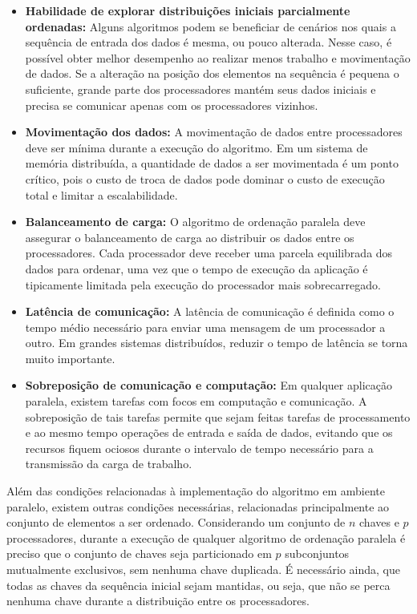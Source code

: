 \begin{itemize}
\item \textbf{Habilidade de explorar distribuições iniciais parcialmente ordenadas:}
Alguns algoritmos podem se beneficiar de cenários nos quais a sequência de entrada dos dados é mesma, ou pouco alterada. Nesse caso, é possível obter melhor desempenho ao realizar menos trabalho e movimentação de dados.
Se a alteração na posição dos elementos na sequência é pequena o suficiente, grande parte dos processadores mantém seus dados iniciais e precisa se comunicar apenas com os processadores vizinhos.

\item \textbf{Movimentação dos dados:}
A movimentação de dados entre processadores deve ser mínima durante a execução do algoritmo. Em um sistema de memória distribuída, a quantidade de dados a ser movimentada é um ponto crítico, pois o custo de troca de dados pode dominar o custo de execução total e limitar a escalabilidade.

\item \textbf{Balanceamento de carga:}
O algoritmo de ordenação paralela deve assegurar o balanceamento de carga ao distribuir os dados entre os processadores. Cada processador deve receber uma parcela equilibrada dos dados para ordenar, uma vez que o tempo de execução da aplicação é tipicamente limitada pela execução do processador mais sobrecarregado.

\item \textbf{Latência de comunicação:}
A latência de comunicação é definida como o tempo médio necessário para enviar uma mensagem de um processador a outro.
Em grandes sistemas distribuídos, reduzir o tempo de latência se torna muito importante.

\item \textbf{Sobreposição de comunicação e computação:}
Em qualquer aplicação paralela, existem tarefas com focos em computação e comunicação. A sobreposição de tais tarefas permite que sejam feitas tarefas de processamento e ao mesmo tempo operações de entrada e saída de dados, evitando que os recursos fiquem ociosos durante o intervalo de tempo necessário para a transmissão da carga de trabalho.

\end{itemize}


Além das condições relacionadas à implementação do algoritmo em ambiente paralelo, existem outras condições necessárias, relacionadas principalmente ao conjunto de elementos a ser ordenado. Considerando um conjunto de $n$ chaves e  $p$ processadores,  durante a execução de qualquer algoritmo de ordenação paralela é preciso que o conjunto de chaves seja particionado em $p$ subconjuntos mutualmente exclusivos, sem nenhuma chave duplicada. É necessário ainda, que todas as chaves da sequência inicial sejam mantidas, ou seja, que não se perca nenhuma chave durante a distribuição entre os processadores.


